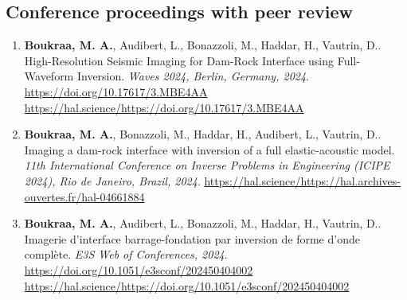 \documentclass[10pt]{article} %
\begin{document}
\subsection{Conference proceedings with peer review}
\begin{enumerate}
\item \textbf{Boukraa, M. A.}, Audibert, L., Bonazzoli, M., Haddar, H., Vautrin, D.. High-Resolution Seismic Imaging for Dam-Rock Interface using Full-Waveform Inversion. \textit{Waves 2024, Berlin, Germany, 2024}. \url{https://doi.org/10.17617/3.MBE4AA} \url{https://hal.science/https://doi.org/10.17617/3.MBE4AA}
\item \textbf{Boukraa, M. A.}, Bonazzoli, M., Haddar, H., Audibert, L., Vautrin, D.. Imaging a dam-rock interface with inversion of a full elastic-acoustic model. \textit{11th International Conference on Inverse Problems in Engineering (ICIPE 2024), Rio de Janeiro, Brazil, 2024}. \url{https://hal.science/https://hal.archives-ouvertes.fr/hal-04661884}
\item \textbf{Boukraa, M. A.}, Audibert, L., Bonazzoli, M., Haddar, H., Vautrin, D.. Imagerie d’interface barrage-fondation par inversion de forme d’onde complète. \textit{E3S Web of Conferences, 2024}. \url{https://doi.org/10.1051/e3sconf/202450404002} \url{https://hal.science/https://doi.org/10.1051/e3sconf/202450404002}
\end{enumerate}




\end{document}
